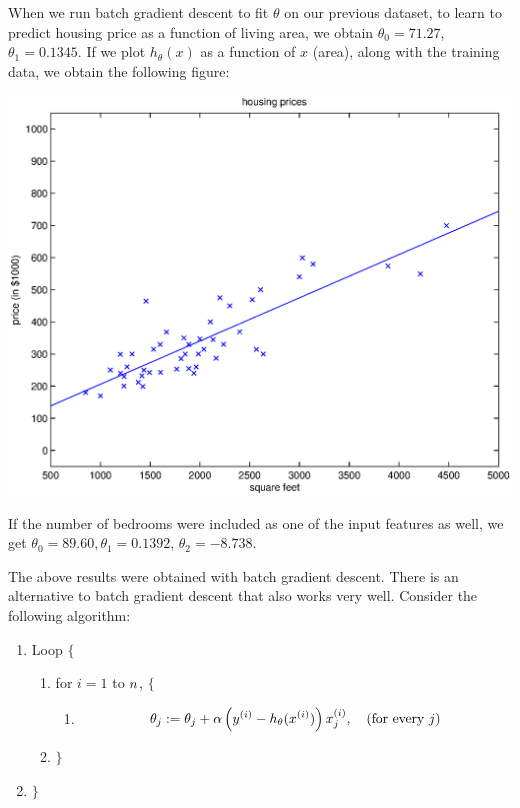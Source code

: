 \documentclass{article}
\begin{document}
When we run batch gradient descent to fit $\theta$ on our previous dataset,
to learn to predict housing price as a function of living area, we
obtain $\theta_0 = 71.27$, $\theta_1 = 0.1345$.  If we plot
$h_\theta(x)$ as a function of $x$ (area), along with the training data, we
obtain the
following figure:
\begin{center}
\includegraphics[scale=0.5]{housingGDConverged.eps}
\end{center}
If the number of bedrooms were included as one of the input features as well,
we get $\theta_0 = 89.60, \theta_1 = 0.1392$, $\theta_2 = -8.738$.

The above results were obtained with batch gradient descent.  There is an
alternative to batch gradient descent that also works very well.
Consider the following algorithm:
\begin{enumerate}
\item[] Loop $\{$
\begin{enumerate}
\item[] for $i=1$ to ${n}$, $\{$
\begin{enumerate}
\item[] \begin{align}\theta_j := \theta_j + \alpha \left({y^{(i)}} - h_\theta({x^{(i)}})\right) x^{(i)}_j, ~~~(\textup{for every } j)\label{eqn:update}\end{align}
\end{enumerate}
\item[] $\}$
\end{enumerate}
\item[] $\}$
\end{enumerate}
\end{document}
